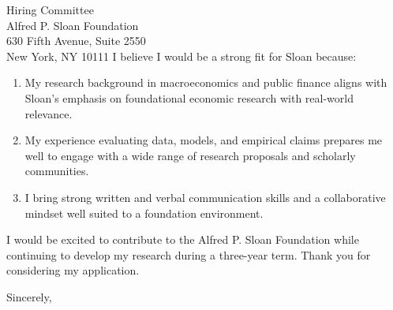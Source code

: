 \documentclass[11pt,letterpaper]{letter}
\begin{document}
\begin{letter}{Hiring Committee \\
Alfred P. Sloan Foundation \\
630 Fifth Avenue, Suite 2550 \\
New York, NY 10111}
I believe I would be a strong fit for Sloan because:
\begin{enumerate}
    \item My research background in macroeconomics and public finance aligns with Sloan’s emphasis on foundational economic research with real-world relevance.
    \item My experience evaluating data, models, and empirical claims prepares me well to engage with a wide range of research proposals and scholarly communities.
    \item I bring strong written and verbal communication skills and a collaborative mindset well suited to a foundation environment.
\end{enumerate}

I would be excited to contribute to the Alfred P. Sloan Foundation while continuing to develop my research during a three-year term. Thank you for considering my application.

\closing{Sincerely,}

\end{letter}
\end{document}
